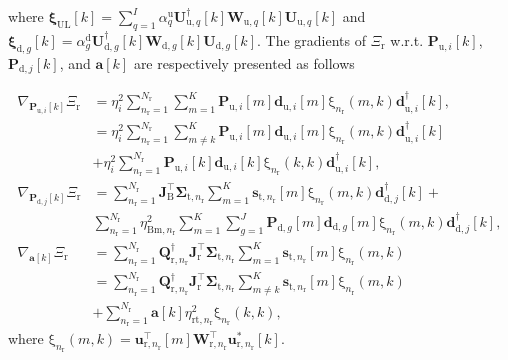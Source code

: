 \documentclass[9pt,journal]{IEEEtran}
\newcommand{\paren}[1]{\left({#1}\right)}
\newcommand{\bracket}[1]{{\left [{#1}\right ]}}
\newcommand{\rr}{_\mathrm{r}}
\newcommand{\rnr}{_{\mathrm{r},n_\mathrm{r}}}
\newcommand{\target}{\mathrm{t}}
\newcommand{\sigmanr}{\boldsymbol{\Sigma}_{\textrm{t},n\rr}}
\newcommand{\PiB}{\mathbf{P}_{\textrm{u},i}\bracket{k}}
\newcommand{\PBj}{\mathbf{P}_{\textrm{d},j}\bracket{k}}
\newcommand{\UqB}{\mathbf{U}_{\textrm{u},q}\bracket{k}}
\newcommand{\UqBnH}{\mathbf{U}^\dagger_{\textrm{u},q}\bracket{k}}
\newcommand{\WqB}{\mathbf{W}_{\textrm{u},q}\bracket{k}}
\begin{document}
where $\boldsymbol{\xi}_{\textrm{UL}}\bracket{k}$$=\sum_{q=1}^{\mathit{I}}\alpha^\textrm{u}_q\UqBnH\WqB\UqB$ and  $\boldsymbol{\xi}_{\textrm{d},g}\bracket{k}=\alpha^\textrm{d}_g\mathbf{U}^\dagger_{\textrm{d},g}\bracket{k}\mathbf{W}_{\textrm{d},g}\bracket{k}\mathbf{U}_{\textrm{d},g}\bracket{k}$.
The gradients of $\Xi_{\text{r}}$ w.r.t. $\PiB$, $\PBj$, and $\mathbf{a}\bracket{k}$ are respectively presented as follows  \par\noindent\small
\begin{align}
\nabla_{\PiB}\Xi_{\text{r}}&=\eta^2_i\sum_{n\rr=1}^{\mathit{N}\rr}\sum_{m=1}^{\mathrm{\mathit{K}}}\mathbf{P}_{\textrm{u},i}\bracket{m}\mathbf{d}_{\textrm{u},i}\bracket{m}\mathrm{\xi}_{n\rr}\paren{m,k}\mathbf{d}^\dagger_{\textrm{u},i}\bracket{k},\nonumber\\
&=\eta^2_i\sum_{n\rr=1}^{\mathit{N}\rr}\sum_{m\neq k}^{\mathrm{\mathit{K}}}\mathbf{P}_{\textrm{u},i}\bracket{m}\mathbf{d}_{\textrm{u},i}\bracket{m}\mathrm{\xi}_{n\rr}\paren{m,k}\mathbf{d}^\dagger_{\textrm{u},i}\bracket{k}\nonumber\\
&+\eta^2_i\sum_{n\rr=1}^{\mathit{N}\rr}\mathbf{P}_{\textrm{u},i}\bracket{k}\mathbf{d}_{\textrm{u},i}\bracket{k}\mathrm{\xi}_{n\rr}\paren{k,k}\mathbf{d}^\dagger_{\textrm{u},i}\bracket{k}\nonumber,\\
\nabla_{\PBj}\Xi_{\text{r}}
&=\sum_{n\rr=1}^{\mathit{N}\rr}\mathbf{J}^\top_{\textrm{B}}\sigmanr\sum_{m=1}^{\mathrm{\mathit{K}}}\mathbf{s}_{\target,n\rr}\bracket{m}\mathrm{\xi}_{n\rr}\paren{m,k}\mathbf{d}^\dagger_{\textrm{d},j}\bracket{k}+\nonumber\\
&\sum_{n\rr=1}^{\mathit{N}\rr}\eta^2_{\textrm{Bm},n\rr}\sum_{m=1}^{\mathrm{\mathit{K}}}\sum_{g=1}^{\mathit{J}}\mathbf{P}_{\textrm{d},g}\bracket{m}\mathbf{d}_{\textrm{d},g}\bracket{m}\mathrm{\xi}_{n\rr}\paren{m,k}\mathbf{d}^\dagger_{\textrm{d},j}\bracket{k},\nonumber\\
\nabla_{\mathbf{a}\bracket{k}}\Xi_{\text{r}}&= \sum_{n\rr=1}^{\mathit{N}\rr}\mathbf{Q}^\dagger\rnr\mathbf{J}^\top_{\textrm{r}}\sigmanr\sum_{m=1}^{\mathrm{\mathit{K}}}\mathbf{s}_{\target,n\rr}\bracket{m}\mathrm{\xi}_{n\rr}\paren{m,k}\nonumber\\
&=\sum_{n\rr=1}^{\mathit{N}\rr}\mathbf{Q}^\dagger\rnr\mathbf{J}^\top_{\textrm{r}}\sigmanr\sum_{m\neq k}^{\mathrm{\mathit{K}}}\mathbf{s}_{\target,n\rr}\bracket{m}\mathrm{\xi}_{n\rr}\paren{m,k}\nonumber\\
&+\sum_{n\rr=1}^{\mathit{N}\rr}\mathbf{a}\bracket{k}\eta^2_{\textrm{rt},n\rr}\mathrm{\xi}_{n\rr}\paren{k,k},\nonumber
\end{align}
where  $\mathrm{\xi}_{n\rr}\paren{m,k}$$=\mathbf{u}^\top_{\textrm{r},n\rr}\bracket{m}\mathbf{W}^\top\rnr\mathbf{u}^\ast_{\textrm{r},n\rr}\bracket{k}$.
\end{document}
